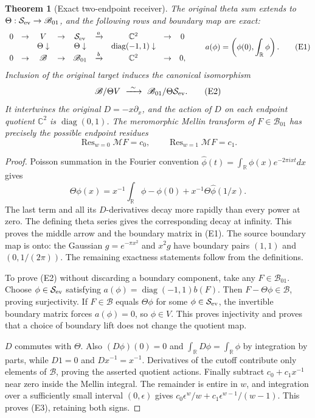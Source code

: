 \documentclass[11pt]{article}
\newtheorem{theorem}{Theorem}[section]
\newcommand{\C}{\mathbb C}\newcommand{\R}{\mathbb R}
\newcommand{\B}{\mathscr B}\newcommand{\M}{\mathcal M}
\begin{document}
\begin{theorem}[Exact two-endpoint receiver]\label{thm:two-endpoints}
The original theta sum extends to $\Theta:\mathcal S_{\rm ev}\to\B_{01}$,
and the following rows and boundary map are exact:
\[
 \begin{array}{ccccccccc}
 0&\to& V&\to&\mathcal S_{\rm ev}&\xrightarrow{a}&\C^2&\to&0\\
 &&\Theta\downarrow&&\Theta\downarrow&&\operatorname{diag}(-1,1)\downarrow\\
 0&\to&\B&\to&\B_{01}&\xrightarrow{b}&\C^2&\to&0,
 \end{array}
 \qquad a(\phi)=\left(\phi(0),\int_\R\phi\right).
 \tag{E1}
\]
Inclusion of the original target induces the canonical isomorphism
\[
 \B/\Theta V\ \xrightarrow{\ \sim\ }\
 \B_{01}/\Theta\mathcal S_{\rm ev}.\tag{E2}
\]
It intertwines the original $D=-x\partial_x$, and the action of $D$ on
each endpoint quotient $\C^2$ is $\operatorname{diag}(0,1)$.
The meromorphic Mellin transform of $F\in\B_{01}$ has precisely the
possible endpoint residues
\[
 \operatorname{Res}_{w=0}\M F=c_0,\qquad
 \operatorname{Res}_{w=1}\M F=c_1.\tag{E3}
\]
\end{theorem}
\begin{proof}
Poisson summation in the Fourier convention
$\widehat\phi(t)=\int_\R\phi(x)e^{-2\pi ixt}dx$ gives
\[
 \Theta\phi(x)=x^{-1}\!\int_\R\phi-\phi(0)
                         +x^{-1}\Theta\widehat\phi(1/x).
\]
The last term and all its $D$-derivatives decay more rapidly than every
power at zero. The defining theta series gives the corresponding decay
at infinity. This proves the middle arrow and the boundary matrix in
(E1). The source boundary map is onto: the Gaussian $g=e^{-\pi x^2}$
and $x^2g$ have boundary pairs $(1,1)$ and $(0,1/(2\pi))$.
The remaining exactness statements follow from the definitions.

To prove (E2) without discarding a boundary component, take any
$F\in\B_{01}$. Choose $\phi\in\mathcal S_{\rm ev}$ satisfying
$a(\phi)=\operatorname{diag}(-1,1)b(F)$. Then $F-\Theta\phi\in\B$,
proving surjectivity. If $F\in\B$ equals $\Theta\phi$ for some
$\phi\in\mathcal S_{\rm ev}$, the invertible boundary matrix forces
$a(\phi)=0$, so $\phi\in V$. This proves injectivity and proves
that a choice of boundary lift does not change the quotient map.

$D$ commutes with $\Theta$. Also $(D\phi)(0)=0$ and
$\int_\R D\phi=\int_\R\phi$ by integration by parts, while
$D1=0$ and $Dx^{-1}=x^{-1}$. Derivatives of the cutoff contribute
only elements of $\B$, proving the asserted quotient actions.
Finally subtract $c_0+c_1x^{-1}$ near zero inside the Mellin integral.
The remainder is entire in $w$, and integration over a sufficiently
small interval $(0,\epsilon)$ gives
$c_0\epsilon^w/w+c_1\epsilon^{w-1}/(w-1)$.
This proves (E3), retaining both signs.
\end{proof}
\end{document}
